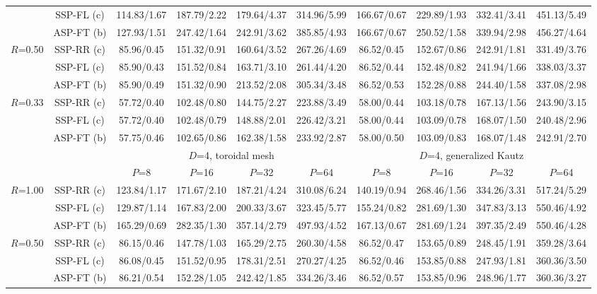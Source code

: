 \documentclass[10pt,twocolumn,journal]{IEEEtran}
\begin{document}
\begin{table*}[t!]
{\begin{tabular}{|c|c|c|c|c|c|c|c|c|c|}
& SSP-FL (c) & 114.83/1.67 & 187.79/2.22 & 179.64/4.37 & 314.96/5.99 & 166.67/0.67 & 229.89/1.93 & 332.41/3.41 & 451.13/5.49 \\
& ASP-FT (b) & 127.93/1.51 & 247.42/1.64 & 242.91/3.62 & 385.85/4.93 & 166.67/0.67 & 250.52/1.58 & 339.94/2.98 & 456.27/4.64 \\
\hline
\multirow{3}{*}{$R$=0.50} & SSP-RR (c) & 85.96/0.45 & 151.32/0.91 & 160.64/3.52 & 267.26/4.69 & 86.52/0.45 & 152.67/0.86 & 242.91/1.81 & 331.49/3.76 \\
& SSP-FL (c) & 85.90/0.43 & 151.52/0.84 & 163.71/3.10 & 261.44/4.20 & 86.52/0.44 & 152.48/0.82 & 241.94/1.66 & 338.03/3.37 \\
& ASP-FT (b) & 85.90/0.49 & 151.32/0.90 & 213.52/2.08 & 305.34/3.48 & 86.52/0.53 & 152.28/0.88 & 244.40/1.58 & 337.08/2.98 \\
\hline
\multirow{3}{*}{$R$=0.33} & SSP-RR (c) & 57.72/0.40 & 102.48/0.80 & 144.75/2.27 & 223.88/3.49 & 58.00/0.44 & 103.18/0.78 & 167.13/1.56 & 243.90/3.15 \\
& SSP-FL (c) & 57.72/0.40 & 102.48/0.79 & 148.88/2.01 & 226.42/3.21 & 58.00/0.44 & 103.09/0.78 & 168.07/1.50 & 240.48/2.96 \\
& ASP-FT (b) & 57.75/0.46 & 102.65/0.86 & 162.38/1.58 & 233.92/2.87 & 58.00/0.50 & 103.09/0.83 & 168.07/1.48 & 242.91/2.70 \\
\hline
\hline
& 	 & \multicolumn{4}{c|}{$D$=4, toroidal mesh} & \multicolumn{4}{c|}{$D$=4, generalized Kautz} \\
\hline
& 	 & $P$=8 & $P$=16 & $P$=32 & $P$=64 & $P$=8 & $P$=16 & $P$=32 & $P$=64 \\
\hline
\multirow{3}{*}{$R$=1.00} & SSP-RR (c) & 123.84/1.17 & 171.67/2.10 & 187.21/4.24 & 310.08/6.24 & 140.19/0.94 & 268.46/1.56 & 334.26/3.31 & 517.24/5.29 \\
& SSP-FL (c) & 129.87/1.14 & 167.83/2.00 & 200.33/3.67 & 323.45/5.77 & 155.24/0.82 & 281.69/1.30 & 347.83/3.13 & 550.46/4.92 \\
& ASP-FT (b) & 165.29/0.69 & 282.35/1.30 & 357.14/2.79 & 497.93/4.52 & 167.13/0.67 & 281.69/1.24 & 397.35/2.49 & 550.46/4.28 \\
\hline
\multirow{3}{*}{$R$=0.50} & SSP-RR (c) & 86.15/0.46 & 147.78/1.03 & 165.29/2.75 & 260.30/4.58 & 86.52/0.47 & 153.65/0.89 & 248.45/1.91 & 359.28/3.64 \\
& SSP-FL (c) & 86.08/0.45 & 151.52/0.95 & 178.31/2.51 & 270.27/4.25 & 86.52/0.46 & 153.85/0.88 & 247.93/1.81 & 360.36/3.50 \\
& ASP-FT (b) & 86.21/0.54 & 152.28/1.05 & 242.42/1.85 & 334.26/3.46 & 86.52/0.57 & 153.85/0.96 & 248.96/1.77 & 360.36/3.27 \\

\end{tabular}}
\end{table*}
\end{document}
